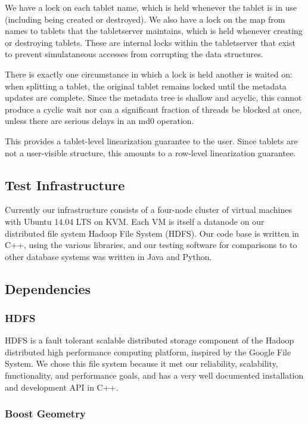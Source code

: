 \documentclass[11pt]{article}
\begin{document}
We have a lock on each tablet name, which is held whenever the tablet is in use (including being created or destroyed).  We also have a lock on the map from names to tablets that the tabletserver maintains, which is held whenever creating or destroying tablets.  These are internal locks within the tabletserver that exist to prevent simulataneous accesses from corrupting the data structures.

There is exactly one circumstance in which a lock is held another is waited on: when splitting a tablet, the original tablet remains locked until the metadata updates are complete.  Since the metadata tree is shallow and acyclic, this cannot produce a cyclic wait nor can a significant fraction of threads be blocked at once, unless there are serious delays in an md0 operation.

This provides a tablet-level linearization guarantee to the user.  Since tablets are not a user-visible structure, this amounts to a row-level linearization guarantee.

\subsection{Test Infrastructure}

Currently our infrastructure consists of a four-node cluster of virtual machines with Ubuntu 14.04 LTS on KVM. Each VM is itself a datanode on our distributed file system Hadoop File System (HDFS). Our code base is written in C++, using the various libraries, and our testing software for comparisons to to other database systems was written in Java and Python.

\subsection{Dependencies}

\subsubsection{HDFS}

HDFS is a fault tolerant scalable distributed storage component of the Hadoop distributed high performance computing platform, inspired by the Google File System. We chose this file system because it met our reliability, scalability, functionality, and performance goals, and has a very well documented installation and development API in C++. 

\subsubsection{Boost Geometry}
\end{document}
